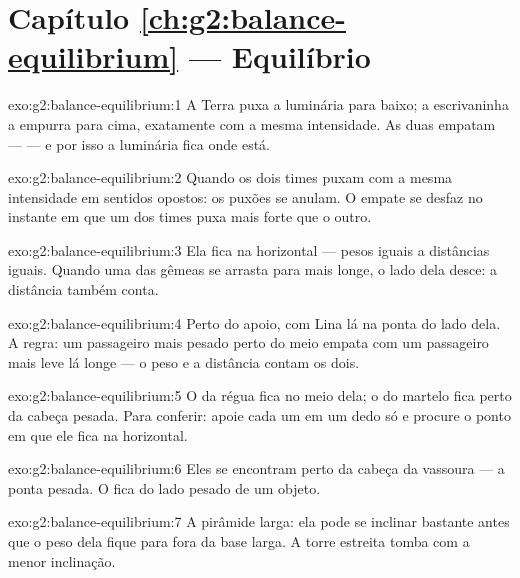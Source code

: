 \section*{Capítulo \ref{ch:g2:balance-equilibrium} --- Equilíbrio}

\begin{solution}{exo:g2:balance-equilibrium:1}
A Terra puxa a luminária para baixo; a escrivaninha a empurra para
cima, exatamente com a mesma intensidade. As duas  empatam ---
 --- e por isso a luminária fica onde está.
\end{solution}

\begin{solution}{exo:g2:balance-equilibrium:2}
Quando os dois times puxam com a mesma intensidade em sentidos
opostos: os puxões se anulam. O empate se desfaz no instante em que
um dos times puxa mais forte que o outro.
\end{solution}

\begin{solution}{exo:g2:balance-equilibrium:3}
Ela fica na horizontal --- pesos iguais a distâncias iguais. Quando
uma das gêmeas se arrasta para mais longe, o lado dela desce: a
distância também conta.
\end{solution}

\begin{solution}{exo:g2:balance-equilibrium:4}
Perto do apoio, com Lina lá na ponta do lado dela. A regra: um
passageiro mais pesado perto do meio empata com um passageiro mais
leve lá longe --- o peso e a distância contam os dois.
\end{solution}

\begin{solution}{exo:g2:balance-equilibrium:5}
O  da régua fica no meio dela; o do martelo fica
perto da cabeça pesada. Para conferir: apoie cada um em um dedo só e
procure o ponto em que ele fica na horizontal.
\end{solution}

\begin{solution}{exo:g2:balance-equilibrium:6}
Eles se encontram perto da cabeça da vassoura --- a ponta pesada. O
 fica do lado pesado de um objeto.
\end{solution}

\begin{solution}{exo:g2:balance-equilibrium:7}
A pirâmide larga: ela pode se inclinar bastante antes que o peso dela
fique para fora da base larga. A torre estreita tomba com a menor
inclinação.
\end{solution}


